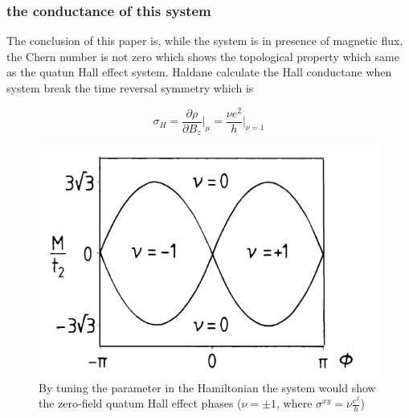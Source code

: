 \documentclass{beamer}
\begin{document}
\begin{frame}
  \frametitle{the conductance of this system}
The conclusion of this paper is, while the system is in presence of
magnetic flux, the Chern number is not zero which shows the topological
property which same as the quatun Hall effect system. Haldane calculate the
Hall conductane when system break the time reversal symmetry which is

\begin{equation*}
  \sigma_{H} = \frac{\partial \rho}{\partial B_{z}} \bigg\rvert_{\mu} =
  \frac{\nu e^{2}}{h} \bigg\rvert_{\nu = 1} 
\end{equation*}
\end{frame}

\begin{frame}
 \begin{figure}[htpb]
  \centering
  \includegraphics[width=0.8\linewidth]{cherm.png}
  \caption{By tuning the parameter in the Hamiltonian
  the system would show the zero-field quatum Hall effect phases ($\nu=\pm
1$, where $\sigma^{xy}=\nu \frac{e^2}{h}$)}%
  \label{fig:cherm}
\end{figure}
\end{frame}

\end{document}
